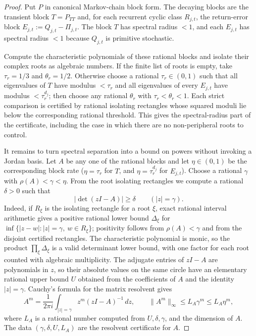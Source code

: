 \begin{proof}
  Put \(P\) in canonical Markov-chain block form. The decaying blocks
  are the transient block \(T=P_{TT}\) and, for each recurrent cyclic
  class \(R_{j,t}\), the return-error block
  \(E_{j,t}:=Q_{j,t}-\Pi_{j,t}\). The block \(T\) has spectral radius
  \(<1\), and each \(E_{j,t}\) has spectral radius \(<1\) because
  \(Q_{j,t}\) is primitive stochastic.

  Compute the characteristic polynomials of these rational blocks and
  isolate their complex roots as algebraic numbers. If the finite list
  of roots is empty, take \(\tau_r=1/3\) and \(\theta_r=1/2\). Otherwise
  choose a rational \(\tau_r\in(0,1)\) such that all eigenvalues of
  \(T\) have modulus \(<\tau_r\) and all eigenvalues of every
  \(E_{j,t}\) have modulus \(<\tau_r^{d_j}\); then choose any rational
  \(\theta_r\) with \(\tau_r<\theta_r<1\). Each strict comparison is
  certified by rational isolating rectangles whose squared moduli lie
  below the corresponding rational threshold. This gives the
  spectral-radius part of the certificate, including the case in which
  there are no non-peripheral roots to control.

  It remains to turn spectral separation into a bound on powers without
  invoking a Jordan basis. Let \(A\) be any one of the rational blocks
  and let \(\eta\in(0,1)\) be the corresponding block rate
  (\(\eta=\tau_r\) for \(T\), and
  \(\eta=\tau_r^{d_j}\) for \(E_{j,t}\)). Choose a rational
  \(\gamma\) with \(\rho(A)<\gamma<\eta\). From the root isolating
  rectangles we compute a rational \(\delta>0\) such that
  \[
    |\det(zI-A)|\ge\delta\qquad(|z|=\gamma).
  \]
  Indeed, if \(R_\xi\) is the isolating rectangle for a root \(\xi\),
  exact rational interval arithmetic gives a positive rational lower
  bound \(\Delta_\xi\) for
  \(\inf\{|z-w|:|z|=\gamma,\ w\in R_\xi\}\); positivity follows from
  \(\rho(A)<\gamma\) and from the disjoint certified rectangles. The
  characteristic polynomial is monic, so the
  product \(\prod_\xi\Delta_\xi\) is a valid determinant lower bound,
  with one factor for each root counted with algebraic multiplicity. The
  adjugate entries of
  \(zI-A\) are polynomials in \(z\), so their absolute values on the
  same circle have an elementary rational upper bound \(U\) obtained
  from the coefficients of \(A\) and the identity \(|z|=\gamma\).
  Cauchy's formula
  for the matrix resolvent gives
  \[
    A^m=\frac{1}{2\pi i}\int_{|z|=\gamma}z^m(zI-A)^{-1}\,dz,
    \qquad
    \|A^m\|_\infty\le L_A\gamma^m\le L_A\eta^m,
  \]
  where \(L_A\) is a rational number computed from \(U,\delta,\gamma\),
  and the dimension of \(A\). The data
  \((\gamma,\delta,U,L_A)\) are the resolvent certificate for \(A\).


\end{proof}
